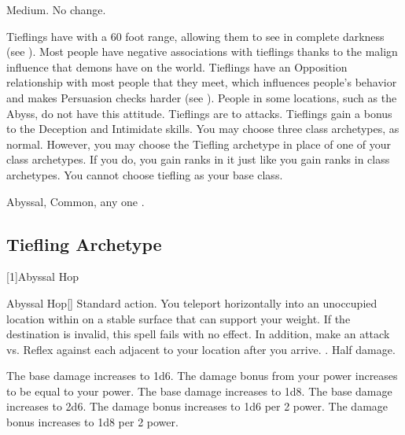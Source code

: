    Medium.
   No change.
  \begin{raggeditemize}
     Tieflings have  with a 60 foot range, allowing them to see in complete darkness (see ).
     Most people have negative associations with tieflings thanks to the malign influence that demons have on the world.
      Tieflings have an Opposition relationship with most people that they meet, which influences people's behavior and makes Persuasion checks harder (see ).
      People in some locations, such as the Abyss, do not have this attitude.
     Tieflings are  to \atFire attacks.
     Tieflings gain a  bonus to the Deception and Intimidate skills.
     You may choose three class archetypes, as normal.
      However, you may choose the Tiefling archetype in place of one of your class archetypes.
      If you do, you gain ranks in it just like you gain ranks in class archetypes.
      You cannot choose tiefling as your base class.
  \end{raggeditemize}
   Abyssal, Common, any one .

  \subsection{Tiefling Archetype}
    [1]{Abyssal Hop}
      \begin{magicalactiveability}{Abyssal Hop}[\atFire]
        \abilityusagetime Standard action.
        \rankline
        You teleport horizontally into an unoccupied location within \shortrange on a stable surface that can support your weight.
        If the destination is invalid, this spell fails with no effect.
        In addition, make an attack vs. Reflex against each  adjacent to your location after you arrive.
        \hit \damagerankzero.
        \miss Half damage.

        \rankline
         The base damage increases to 1d6.
         The damage bonus from your power increases to be equal to your power.
         The base damage increases to 1d8.
         The base damage increases to 2d6.
         The damage bonus increases to 1d6 per 2 power.
         The damage bonus increases to 1d8 per 2 power.
      \end{magicalactiveability}

